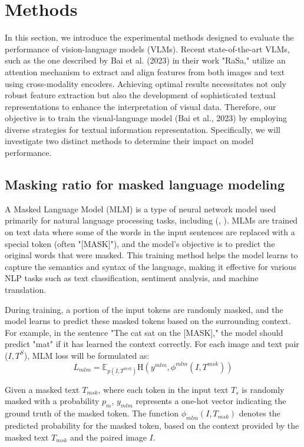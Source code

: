 \section{Methods}
In this section, we introduce the experimental methods designed to evaluate the performance of vision-language models (VLMs). Recent state-of-the-art VLMs, such as the one described by Bai et al. (2023) in their work "RaSa," utilize an attention mechanism to extract and align features from both images and text using cross-modality encoders. Achieving optimal results necessitates not only robust feature extraction but also the development of sophisticated textual representations to enhance the interpretation of visual data. Therefore, our objective is to train the visual-language model (Bai et al., 2023) by employing diverse strategies for textual information representation. Specifically, we will investigate two distinct methods to determine their impact on model performance.


\subsection{Masking ratio for masked language modeling} 
A Masked Language Model (MLM) is a type of neural network model used primarily for natural language processing tasks, including (\cite{devlin2018bert}, \cite{Bai2023RaSaRA}). MLMs are trained on text data where some of the words in the input sentences are replaced with a special token (often "[MASK]"), and the model's objective is to predict the original words that were masked. This training method helps the model learns to capture the semantics and syntax of the language, making it effective for various NLP tasks such as text classification, sentiment analysis, and machine translation.

During training, a portion of the input tokens are randomly masked, and the model learns to predict these masked tokens based on the surrounding context. For example, in the sentence "The cat sat on the [MASK]," the model should predict "mat" if it has learned the context correctly. For each image and text pair ($I,T^S$), MLM loss will be formulated as:
\[
  L_{mlm} = \mathbb{E}_{p \left( I,T^{msk}\right) }\mathrm{H}\left(y^{mlm}, \phi^{mlm}\left(I,T^{msk}\right)\right)
\]

Given a masked text \( T_{msk} \), where each token in the input text \( T_s \) is randomly masked with a probability \( p_m \), \( y_{mlm} \) represents a one-hot vector indicating the ground truth of the masked token. The function \( \phi_{mlm}(I, T_{msk}) \) denotes the predicted probability for the masked token, based on the context provided by the masked text \( T_{msk} \) and the paired image \( I \).

